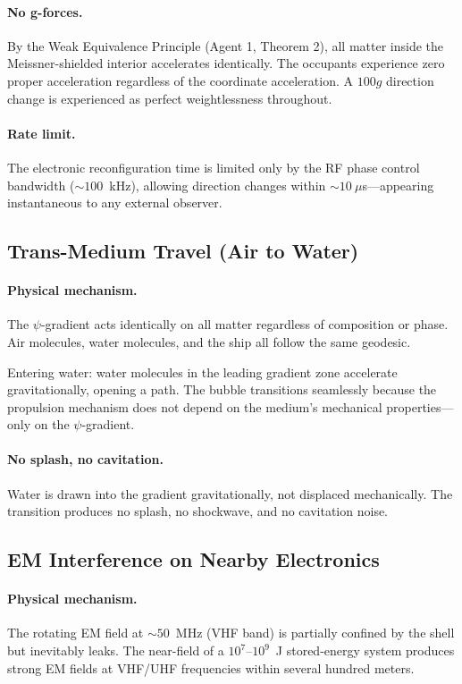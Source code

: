 \documentclass[12pt,aps,prd,superscriptaddress,nofootinbib,longbibliography]{revtex4-2}
\begin{document}
\paragraph{No g-forces.}
By the Weak Equivalence Principle (Agent 1, Theorem 2), all matter inside
the Meissner-shielded interior accelerates identically.  The occupants
experience zero proper acceleration regardless of the coordinate
acceleration.  A $100g$ direction change is experienced as perfect
weightlessness throughout.

\paragraph{Rate limit.}
The electronic reconfiguration time is limited only by the RF phase
control bandwidth ($\sim 100$~kHz), allowing direction changes within
$\sim 10~\mu$s---appearing instantaneous to any external observer.

\subsection{Trans-Medium Travel (Air to Water)}

\paragraph{Physical mechanism.}
The $\psi$-gradient acts identically on all matter regardless of
composition or phase.  Air molecules, water molecules, and the ship
all follow the same geodesic.

Entering water: water molecules in the leading gradient zone accelerate
gravitationally, opening a path.  The bubble transitions seamlessly
because the propulsion mechanism does not depend on the medium's
mechanical properties---only on the $\psi$-gradient.

\paragraph{No splash, no cavitation.}
Water is drawn into the gradient gravitationally, not displaced
mechanically.  The transition produces no splash, no shockwave,
and no cavitation noise.

\subsection{EM Interference on Nearby Electronics}

\paragraph{Physical mechanism.}
The rotating EM field at $\sim 50$~MHz (VHF band) is partially
confined by the shell but inevitably leaks.  The near-field of a
$10^7$--$10^9$~J stored-energy system produces strong EM fields at
VHF/UHF frequencies within several hundred meters.
\end{document}
